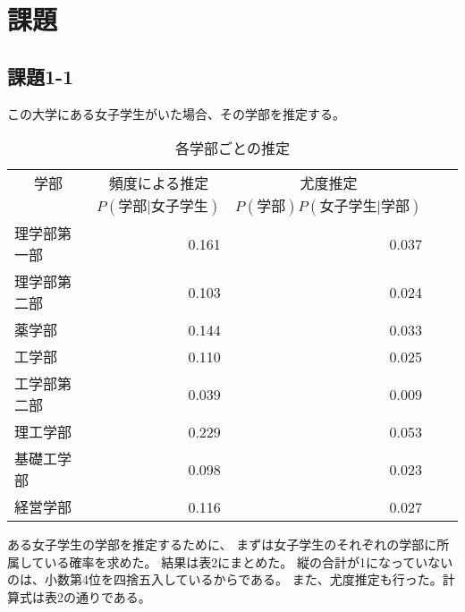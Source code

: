 \documentclass[12pt]{jarticle}
\begin{document}
\clearpage
\section{課題}
\subsection{課題1-1}
\begin{shadebox}
    この大学にある女子学生がいた場合、その学部を推定する。
\end{shadebox}
\begin{table}[h]
    \centering
    \caption{各学部ごとの推定}
    \begin{tabular}{|l|r|r|r|r|} \hline
        \multicolumn{1}{|c|}{学部} & \multicolumn{1}{|c|}{頻度による推定} & \multicolumn{1}{|c|}{尤度推定} \\ \cline{2-3}
                                   & $P(学部|女子学生)$                   & $P(学部)P(女子学生|学部)$      \\ \hline \hline
        理学部第一部               & 0.161                                & 0.037                          \\ \hline
        理学部第二部               & 0.103                                & 0.024                          \\ \hline
        薬学部                     & 0.144                                & 0.033                          \\ \hline
        工学部                     & 0.110                                & 0.025                          \\ \hline
        工学部第二部               & 0.039                                & 0.009                          \\ \hline
        理工学部                   & 0.229                                & 0.053                          \\ \hline
        基礎工学部                 & 0.098                                & 0.023                          \\ \hline
        経営学部                   & 0.116                                & 0.027                          \\ \hline
    \end{tabular}
\end{table}
ある女子学生の学部を推定するために、
まずは女子学生のそれぞれの学部に所属している確率を求めた。
結果は表2にまとめた。
縦の合計が1になっていないのは、小数第4位を四捨五入しているからである。
また、尤度推定も行った。計算式は表2の通りである。
\end{document}
